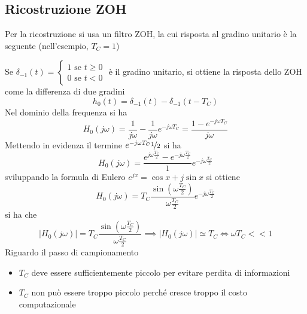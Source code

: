 \documentclass[10pt, letterpaper]{report}
\begin{document}
\subsection{Ricostruzione ZOH}
Per la ricostruzione si usa un filtro ZOH, la cui risposta al gradino unitario è la seguente (nell'esempio, $T_C=1$)
\begin{center}
\end{center}
Se $\delta_{-1}(t)=\begin{cases}
    1 \text{ se }t\ge 0 \\ 0 \text{ se }t<0
\end{cases}$ è il gradino unitario, si ottiene la risposta dello ZOH come la differenza di due gradini 
$$ h_0(t)=\delta_{-1}(t)-\delta_{-1}(t-T_C)$$
Nel dominio della frequenza si ha 
$$H_0(j\omega)=\frac{1}{j\omega}-\frac{1}{j\omega}e^{-j\omega T_C} =\frac{1-e^{-j\omega T_C}}{j\omega}$$
Mettendo in evidenza il termine $e^{-j\omega T_C}\nicefrac{1}{2}$ si ha 
$$ H_0(j\omega)=\frac{e^{j\omega \frac{T_C}{2}}-e^{-j\omega \frac{T_C}{2}}}{1}e^{-j\omega \frac{T_C}{2}}$$
sviluppando la formula di Eulero $e^{jx}=\cos x+j\sin x$ si ottiene 
$$ H_0(j\omega)=T_C\frac{\sin(\omega \frac{T_C}{2})}{\omega \frac{T_C}{2}}e^{-j\omega \frac{T_C}{2}}$$
si ha che 
$$ 
|H_0(j\omega)|=T_C\frac{\sin(\omega \frac{T_C}{2})}{\omega \frac{T_C}{2}}\implies 
|H_0(j\omega)|\simeq T_C \iff \omega T_C<<1
$$
Riguardo il passo di campionamento\begin{itemize}
    \item $T_C$ deve essere sufficientemente piccolo per evitare perdita di informazioni 
    \item $T_C$ non può essere troppo piccolo perché cresce troppo il costo computazionale 
\end{itemize}
\flowerLine 
\end{document}
